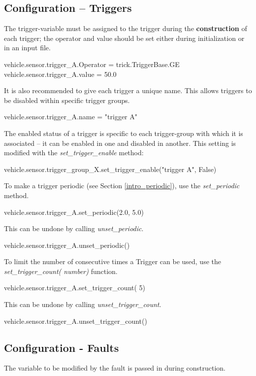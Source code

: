 \documentclass[11pt,fleqn]{report}
\begin{document}
\subsection{ Configuration -- Triggers}
\label{sec:UG:DI:config_trigger}
The trigger-variable must be assigned to the trigger during the
\textbf{construction} of
each trigger; the operator and value should be set either during
initialization or in an input file.
\begin{codePython}
vehicle.sensor.trigger_A.Operator = trick.TriggerBase.GE
vehicle.sensor.trigger_A.value = 50.0
\end{codePython}
It is also recommended to give each trigger a unique name.
This allows triggers to be disabled within specific trigger groups.
\begin{codePython}
vehicle.sensor.trigger_A.name = "trigger A"
\end{codePython}

The enabled status of a trigger is specific to each trigger-group with which it
is associated -- it can be enabled in one and disabled in another. This setting
is modified with the \textit{set\_trigger\_enable} method:
\begin{codePython}
vehicle.sensor.trigger_group_X.set_trigger_enable("trigger A", False)
\end{codePython}

To make a trigger periodic (see Section \ref{intro_periodic}), use the
\textit{set\_periodic} method.
\begin{codePython}
 vehicle.sensor.trigger_A.set_periodic(2.0, 5.0)
\end{codePython}

This can be undone by calling \textit{unset\_periodic}.
\begin{codePython}
 vehicle.sensor.trigger_A.unset_periodic()
\end{codePython}

To limit the number of consecutive times a Trigger can be used, use the
\textit{set\_trigger\_count( number)} function.
\begin{codePython}
 vehicle.sensor.trigger_A.set_trigger_count( 5)
\end{codePython}

This can be undone by calling \textit{unset\_trigger\_count}.
\begin{codePython}
 vehicle.sensor.trigger_A.unset_trigger_count()
\end{codePython}

\subsection{Configuration - Faults}
The variable to be modified by the fault is passed in during construction.
\end{document}

